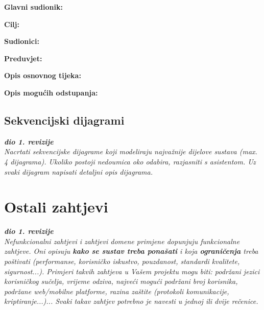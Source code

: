 					\noindent {}
					\begin{packed_item}
						\item \textbf{Glavni sudionik: }
						\item  \textbf{Cilj:}
						\item  \textbf{Sudionici:}
						\item  \textbf{Preduvjet:}
						
						\item  \textbf{Opis osnovnog tijeka:}
						\item[] \begin{packed_enum}
						\end{packed_enum}
						
						\item  \textbf{Opis mogućih odstupanja:}
						\item[] \begin{packed_item}							
						\end{packed_item}
					\end{packed_item}
					
					
					
				
				\eject		
				
			\subsection{Sekvencijski dijagrami}
				
				\textbf{\textit{dio 1. revizije}}\\
				
				\textit{Nacrtati sekvencijske dijagrame koji modeliraju najvažnije dijelove sustava (max. 4 dijagrama). Ukoliko postoji nedoumica oko odabira, razjasniti s asistentom. Uz svaki dijagram napisati detaljni opis dijagrama.}
				\eject
	
		\section{Ostali zahtjevi}
		
			\textbf{\textit{dio 1. revizije}}\\
		 
			 \textit{Nefunkcionalni zahtjevi i zahtjevi domene primjene dopunjuju funkcionalne zahtjeve. Oni opisuju \textbf{kako se sustav treba ponašati} i koja \textbf{ograničenja} treba poštivati (performanse, korisničko iskustvo, pouzdanost, standardi kvalitete, sigurnost...). Primjeri takvih zahtjeva u Vašem projektu mogu biti: podržani jezici korisničkog sučelja, vrijeme odziva, najveći mogući podržani broj korisnika, podržane web/mobilne platforme, razina zaštite (protokoli komunikacije, kriptiranje...)... Svaki takav zahtjev potrebno je navesti u jednoj ili dvije rečenice.}
			 
			 
			 
	